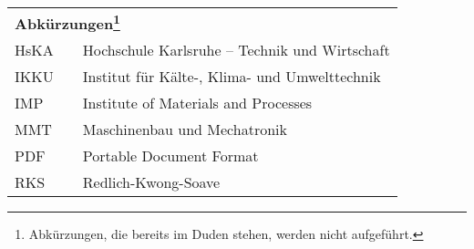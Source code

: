 \begin{longtable}{p{} p{} p{}}
\\
\multicolumn{3}{l}{%
\textbf{\textsf{\large Abkürzungen\footnote{Abkürzungen, die bereits im Duden stehen, werden nicht aufgeführt. }}}
}\\

HsKA     & & Hochschule Karlsruhe -- Technik und Wirtschaft\\
IKKU     & & Institut für Kälte-, Klima- und Umwelttechnik\\
IMP      & & Institute of Materials and Processes\\
MMT      & & Maschinenbau und Mechatronik \\
PDF      & & Portable Document Format \\ 
RKS      & & Redlich-Kwong-Soave \\


\end{longtable}

\cleardoublepage




















